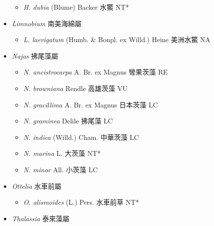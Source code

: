 \begin{itemize}
  \begin{itemize}
        \item[] \textit{H. dubia} (Blume) Backer  水鱉   NT*
  \end{itemize}
 \item[] \textit{Limnobium} 南美海綿屬
                                
  \begin{itemize}
        \item[] \textit{L. laevigatum} (Humb. \& Bonpl. ex Willd.) Heine  美洲水鱉   NA
  \end{itemize}
 \item[] \textit{Najas} 拂尾藻屬
                                
  \begin{itemize}
        \item[] \textit{N. ancistrocarpa} A. Br. ex Magnus  彎果茨藻   RE
        \item[] \textit{N. browniana} Rendle  高雄茨藻   VU
        \item[] \textit{N. gracillima} A. Br. ex Magnus  日本茨藻   LC
        \item[] \textit{N. graminea} Delile  拂尾藻   LC
        \item[] \textit{N. indica} (Willd.) Cham.  中華茨藻   LC
        \item[] \textit{N. marina} L.  大茨藻   NT*
        \item[] \textit{N. minor} All.  小茨藻   LC
  \end{itemize}
 \item[] \textit{Ottelia} 水車前屬
                                
  \begin{itemize}
        \item[] \textit{O. alismoides} (L.) Pers.  水車前草   NT*
  \end{itemize}
 \item[] \textit{Thalassia} 泰來藻屬
                                

\end{itemize}
